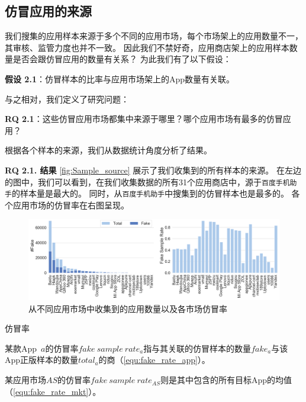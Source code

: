 \subsection{仿冒应用的来源}

我们搜集的应用样本来源于多个不同的应用市场，每个市场架上的应用数量不一，其审核、监管力度也并不一致。
因此我们不禁好奇，应用商店架上的应用样本数量是否会跟仿冒应用的数量有关系？
为此我们有了以下假设：

{\bf 假设 2.1}：仿冒样本的比率与应用市场架上的App数量有关联。

与之相对，我们定义了研究问题：

{\bf RQ 2.1}：这些仿冒应用市场都集中来源于哪里？哪个应用市场有最多的仿冒应用？

根据各个样本的来源，我们从数据统计角度分析了结果。

{\bf RQ 2.1. 结果} \autoref{fig:Sample_source} 展示了我们收集到的所有样本的来源。
在左边的图中，我们可以看到，在我们收集数据的所有31个应用商店中，源于\texttt{百度手机助手}的样本量是最大的。
同时，从\texttt{百度手机助手}中搜集到的仿冒样本也是最多的。
各个应用市场的仿冒率在右图呈现。

\begin{figure}[htbp]
	\centering
  \setlength{\belowcaptionskip}{-10pt}
	\includegraphics[width=\textwidth]{./Figures/edwin-Number_of_samples_collected_markets_3.png}
	\caption{从不同应用市场中收集到的应用数量以及各市场仿冒率}
	\label{fig:Sample_source}
\end{figure}

\begin{Def}
    仿冒率

    某款App~$a$的仿冒率$fake~sample~rate_a$指与其关联的仿冒样本的数量$fake_a$与该App正版样本的数量$total_a$的商（\autoref{equ:fake_rate_app}）。

    某应用市场$AS$的仿冒率$fake~sample~rate_{AS}$则是其中包含的所有目标App的均值（\autoref{equ:fake_rate_mkt}）。
\end{Def}

